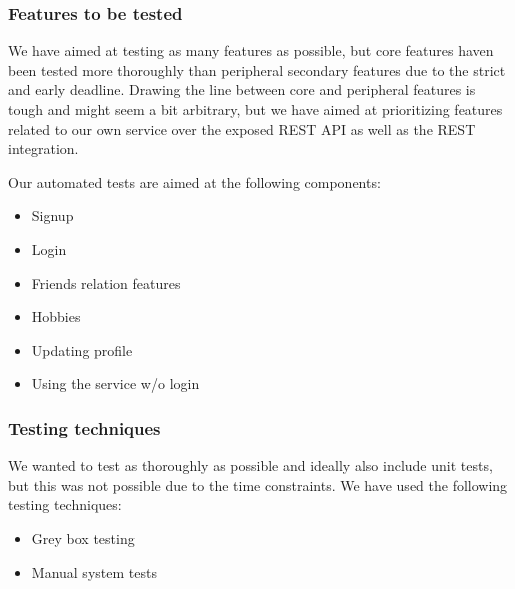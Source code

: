 \documentclass[a4paper]{article}
\begin{document}
\subsubsection{Features to be tested}
We have aimed at testing as many features as possible, but core features haven been tested more thoroughly than peripheral secondary features due to the strict and early deadline. Drawing the line between core and peripheral features is tough and might seem a bit arbitrary, but we have aimed at prioritizing features related to our own service over the exposed REST API as well as the REST integration.

Our automated tests are aimed at the following components:
\begin{itemize}
\item Signup
\item Login
\item Friends relation features
\item Hobbies
\item Updating profile
\item Using the service w/o login
\end{itemize}
\subsubsection{Testing techniques}
We wanted to test as thoroughly as possible and ideally also include unit tests, but this was not possible due to the time constraints.
We have used the following testing techniques:
\begin{itemize}
\item Grey box testing
\item Manual system tests
\end{itemize}
\end{document}
